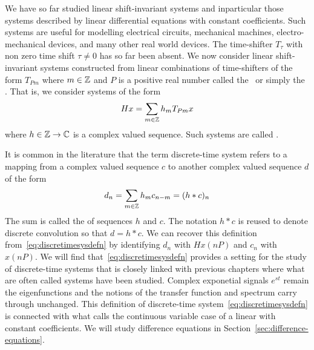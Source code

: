 We have so far studied linear shift-invariant systems and inparticular those systems described by linear differential equations with constant coefficients.  Such systems are useful for modelling electrical circuits, mechanical machines, electro-mechanical devices, and many other real world devices.  %
The time-shifter $T_\tau$ with non zero time shift $\tau \neq 0$ has so far been absent.  %
We now consider linear shift-invariant systems constructed from linear combinations of time-shifters of the form $T_{Pm}$ where $m \in {\mathbb Z}$ and $P$ is a positive real number called the~ or simply the .  That is, we consider systems of the form
\begin{equation}\label{eq:discretimesysdefn}
H x = \sum_{m \in {\mathbb Z}} h_m T_{ P m} x
\end{equation}
where $h \in {\mathbb Z} \to {\mathbb C}$ is a complex valued sequence.  Such systems are called .  

It is common in the literature that the term discrete-time system refers to a mapping from a complex valued sequence $c$ to another complex valued sequence $d$ of the form
\begin{equation}\label{eq:discretimesysdefnusual}
d_n = \sum_{m \in {\mathbb Z}} h_m c_{n-m} = (h * c)_n
\end{equation}
The sum is called the  of sequences $h$ and $c$.  The notation $h * c$ is reused to denote discrete convolution so that $d = h * c$.
We can recover this definition from~\eqref{eq:discretimesysdefn} by identifying $d_n$ with $Hx(nP)$ and $c_n$ with $x(nP)$.  %
We will find that~\eqref{eq:discretimesysdefn} provides a setting for the study of discrete-time systems that is closely linked with previous chapters where what are often called  systems have been studied.  Complex exponetial signals $e^{st}$ remain the eigenfunctions and the notions of the transfer function and spectrum carry through unchanged.  This definition of discrete-time system~\eqref{eq:discretimesysdefn} is connected with what \citet[Sec.~9.5]{Zemanian_dist_theory_1965} calls the continuous variable case of a linear  with constant coefficients.  We will study difference equations in Section~\ref{sec:difference-equations}.

